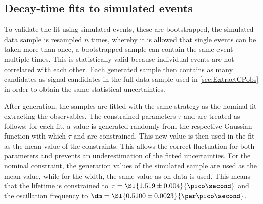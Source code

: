 \subsection{Decay-time fits to simulated events}
\label{sec:valOnSim}

To validate the fit using simulated events, these are bootstrapped, \ie the simulated data sample is resampled $n$ times, whereby it is allowed that single events can be taken more than once, \eg a bootstrapped sample can contain the same event multiple times.
This is statistically valid because individual events are not correlated with each other.
Each generated sample then contains as many candidates as signal candidates in the full \BdToDpi data sample used in \cref{sec:ExtractCPobs} in order to obtain the same statistical uncertainties.

After generation, the samples are fitted with the same strategy as the nominal fit extracting the \CP observables.
The constrained parameters $\tau$ and \dm are treated as follows:
for each fit, a value is generated randomly from the respective Gaussian function with which $\tau$ and \dm are constrained.
This new value is then used in the fit as the mean value of the constraints.
This allows the correct fluctuation for both parameters and prevents an underestimation of the fitted uncertainties.
For the nominal constraint, the generation values of the simulated sample are used as the mean value, while for the width, the same value as on data is used.
This means that the lifetime is constrained to $\tau=\SI{1.519\pm0.004}{\pico\second}$ and the oscillation frequency to $\dm=\SI{0.5100\pm0.0023}{\per\pico\second}$.

